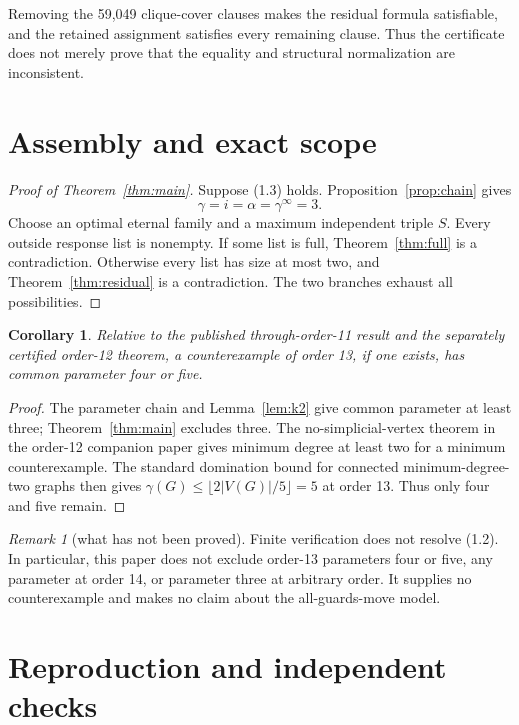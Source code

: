 \documentclass[11pt]{article}
\newtheorem{corollary}[theorem]{Corollary}
\theoremstyle{definition}
\theoremstyle{remark}
\newtheorem{remark}[theorem]{Remark}
\newcommand{\gaminf}{\gamma^{\infty}}
\begin{document}
Removing the 59,049 clique-cover clauses makes the residual formula
satisfiable, and the retained assignment satisfies every remaining
clause.  Thus the certificate does not merely prove that the equality and
structural normalization are inconsistent.

\section{Assembly and exact scope}\label{sec:assemble}

\begin{proof}[Proof of Theorem~\ref{thm:main}]
Suppose (1.3) holds.  Proposition~\ref{prop:chain} gives
\[
  \gamma=i=\alpha=\gaminf=3.
\]
Choose an optimal eternal family and a maximum independent triple \(S\).
Every outside response list is nonempty.  If some list is full,
Theorem~\ref{thm:full} is a contradiction.  Otherwise every list has size
at most two, and Theorem~\ref{thm:residual} is a contradiction.  The two
branches exhaust all possibilities.
\end{proof}

\begin{corollary}\label{cor:frontier}
Relative to the published through-order-11 result and the separately
certified order-12 theorem, a counterexample of order 13, if one exists,
has common parameter four or five.
\end{corollary}

\begin{proof}
The parameter chain and Lemma~\ref{lem:k2} give common parameter at least
three; Theorem~\ref{thm:main} excludes three.  The no-simplicial-vertex
theorem in the order-12 companion paper gives minimum degree at least two
for a minimum counterexample.  The standard domination bound for connected
minimum-degree-two graphs \cite{McCuaigShepherd1989} then gives
\(\gamma(G)\leq\lfloor2|V(G)|/5\rfloor=5\) at order 13.  Thus only four
and five remain.
\end{proof}

\begin{remark}[what has not been proved]
Finite verification does not resolve (1.2).  In particular, this paper
does not exclude order-13 parameters four or five, any parameter at order
14, or parameter three at arbitrary order.  It supplies no counterexample
and makes no claim about the all-guards-move model.
\end{remark}

\section{Reproduction and independent checks}\label{sec:repro}
\end{document}
